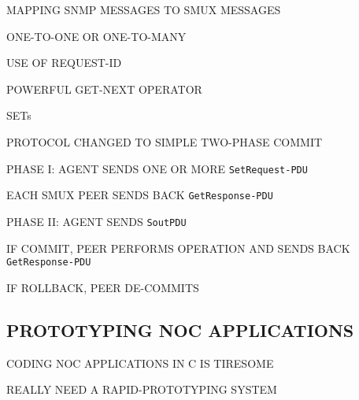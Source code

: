 \begin{bwslide}

\begin{nrtc}
\item	MAPPING SNMP MESSAGES TO SMUX MESSAGES
    \begin{nrtc}
    \item	ONE-TO-ONE OR ONE-TO-MANY

    \item	USE OF REQUEST-ID
    \end{nrtc}

\item	POWERFUL GET-NEXT OPERATOR

\item	SETs
\end{nrtc}
\end{bwslide}


\begin{bwslide}

\begin{nrtc}
\item	PROTOCOL CHANGED TO SIMPLE TWO-PHASE COMMIT

\item	PHASE I: AGENT SENDS ONE OR MORE \verb"SetRequest-PDU"
    \begin{nrtc}
    \item	EACH SMUX PEER SENDS BACK \verb"GetResponse-PDU"
    \end{nrtc}

\item	PHASE II: AGENT SENDS \verb"SoutPDU"
    \begin{nrtc}
    \item	IF COMMIT, PEER PERFORMS OPERATION AND SENDS BACK
		\verb"GetResponse-PDU" 

    \item	IF ROLLBACK, PEER DE-COMMITS
    \end{nrtc}
\end{nrtc}
\end{bwslide}


\begin{bwslide}
\part	{PROTOTYPING NOC APPLICATIONS}\bf

\begin{nrtc}
\item	CODING NOC APPLICATIONS IN C IS TIRESOME

\item	REALLY NEED A RAPID-PROTOTYPING SYSTEM
\end{nrtc}
\end{bwslide}


